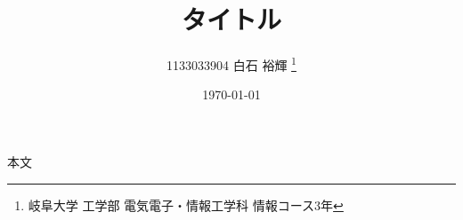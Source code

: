 \documentclass[10pt, a4j]{jsarticle}
\title{タイトル}
\author{
  1133033904 白石 裕輝
  \thanks{岐阜大学 工学部 電気電子・情報工学科 情報コース3年}
}
\date{\today}
\begin{document}
%
\maketitle
%
本文
%
%
\end{document}
